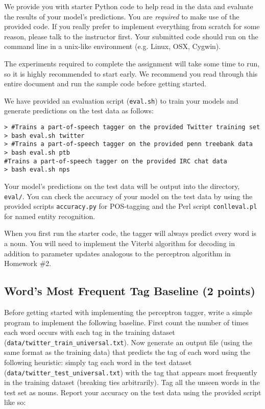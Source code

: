 \documentclass[12pt, letterpaper]{article}
\begin{document}
We provide you with starter Python code to help read in the data and evaluate the results of your model's predictions.
You are \emph{required} to make use of the provided code.  
If you really prefer to implement everything from scratch for some reason, please talk to the instructor first.  Your submitted code
should run on the command line in a unix-like environment (e.g. Linux, OSX, Cygwin).

The experiments required to complete the assignment will take some
time to run, so it is highly recommended to start early.  We recommend you read through this entire document and
run the sample code before getting started.

We have provided an evaluation script ({\tt eval.sh}) to train your models and generate predictions on the test data as follows:
\begin{small}
\begin{verbatim}
> #Trains a part-of-speech tagger on the provided Twitter training set
> bash eval.sh twitter
> #Trains a part-of-speech tagger on the provided penn treebank data
> bash eval.sh ptb       
#Trains a part-of-speech tagger on the provided IRC chat data
> bash eval.sh nps          
\end{verbatim}
\end{small}

Your model's predictions on the test data will be output into the directory, {\tt eval/}.
You can check the accuracy of your model on the test data by using the provided scripts
{\tt accuracy.py} for POS-tagging and the Perl script {\tt conlleval.pl} for named entity
recognition.

When you first run the starter code, the tagger will always predict every word is a noun.  You will need to
implement the Viterbi algorithm for decoding in addition to parameter updates analogous to the
perceptron algorithm in Homework \#2. 

\subsection*{Word's Most Frequent Tag Baseline (2 points)}
Before getting started with implementing the perceptron tagger, write a simple program to implement the following baseline.
First count the number of times each word occurs with each tag in the training dataset ({\tt data/twitter\_train\_universal.txt}).
Now generate an output file (using the same format as the training data) that predicts the tag of each word using the
following heuristic: simply tag each word in the test dataset ({\tt data/twitter\_test\_universal.txt}) with the tag that appears most frequently in the
training dataset (breaking ties arbitrarily).  Tag all the unseen words in the test set as nouns.
Report your accuracy on the test data using the provided script like so:
\end{document}
